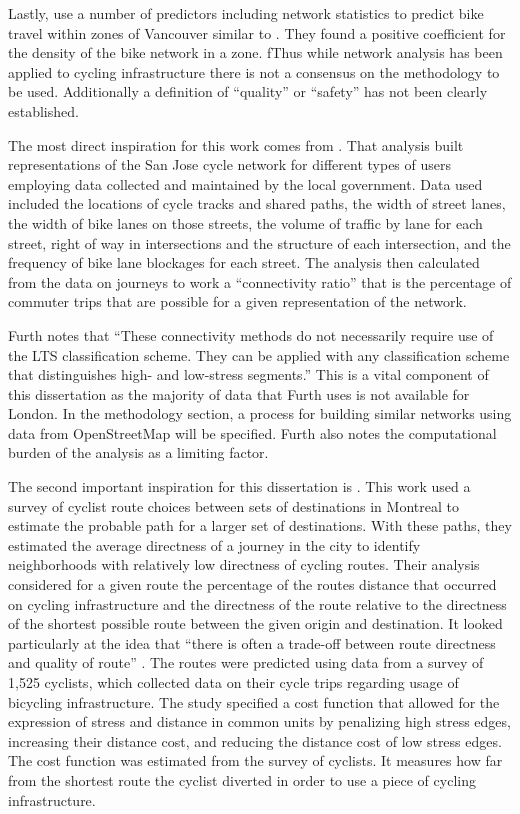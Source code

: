 Lastly, \textcite{osama2017models} use a number of predictors including network statistics to predict bike travel within zones of Vancouver similar to \textcite{schoner2014missing}. They found a positive coefficient for the density of the bike network in a zone. fThus while network analysis has been applied to cycling infrastructure there is not a consensus on the methodology to be used. Additionally a definition of ``quality'' or ``safety'' has not been clearly established. 

The most direct inspiration for this work comes from \textcite{furth2016network}. That analysis built representations of the San Jose cycle network for different types of users employing data collected and maintained by the local government. Data used included the locations of cycle tracks and shared paths, the width of street lanes, the width of bike lanes on those streets,  the volume of traffic by lane for each street, right of way in intersections and the structure of each intersection, and the frequency of bike lane blockages for each street. The analysis then calculated from the data on journeys to work a ``connectivity ratio'' that is the percentage of commuter trips that are possible for a given representation of the network. 

Furth notes that ``These connectivity methods do not necessarily require use of the LTS classification scheme. They can be applied with any classification scheme that distinguishes high- and low-stress segments.'' This is a vital component of this dissertation as the majority of data that Furth uses is not available for London. In the methodology section, a process for building similar networks using data from OpenStreetMap will be specified. Furth also notes the computational burden of the analysis as a limiting factor. 

The second important inspiration for this dissertation is \textcite{boisjoly2019bicycle}. This work used a survey of cyclist route choices between sets of destinations in Montreal to estimate the probable path for a larger set of destinations. With these paths, they estimated the average directness of a journey in the city to identify neighborhoods with relatively low directness of cycling routes.  Their analysis considered for a given route the percentage of the routes distance that occurred on cycling infrastructure and the directness of the route relative to the directness of the shortest possible route between the given origin and destination. It looked particularly at the idea that ``there is often a trade-off between route directness and quality of route'' \parencite{boisjoly2019bicycle}.  The routes were predicted using data from a survey of 1,525 cyclists, which collected data on their cycle trips regarding usage of bicycling infrastructure. The study specified a cost function that allowed for the expression of stress and distance in common units by penalizing high stress edges, increasing their distance cost, and reducing the distance cost of low stress edges. The cost function was estimated from the survey of cyclists. It measures how far from the shortest route the cyclist diverted in order to use a piece of cycling infrastructure. 

